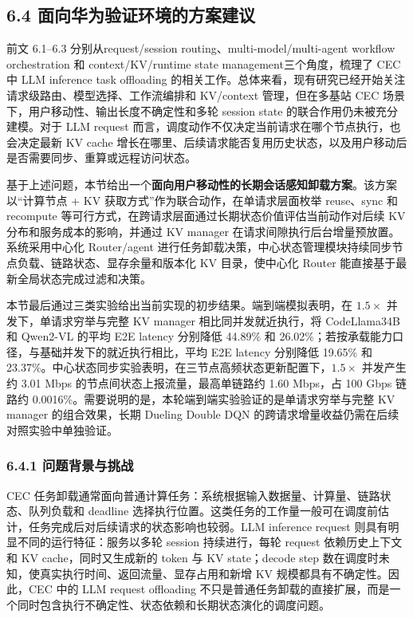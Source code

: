 \subsection*{6.4 面向华为验证环境的方案建议}

前文 6.1--6.3 分别从request/\allowbreak session routing、multi-model/\allowbreak multi-agent workflow orchestration 和 context/\allowbreak KV/\allowbreak runtime state management三个角度，梳理了 CEC 中 LLM inference task offloading 的相关工作。总体来看，现有研究已经开始关注请求级路由、模型选择、工作流编排和 KV/context 管理，但在多基站 CEC 场景下，用户移动性、输出长度不确定性和多轮 session state 的联合作用仍未被充分建模。对于 LLM request 而言，调度动作不仅决定当前请求在哪个节点执行，也会决定最新 KV cache 增长在哪里、后续请求能否复用历史状态，以及用户移动后是否需要同步、重算或远程访问状态。

基于上述问题，本节给出一个\textbf{面向用户移动性的长期会话感知卸载方案}。该方案以“计算节点 + KV 获取方式”作为联合动作，在单请求层面枚举 reuse、sync 和 recompute 等可行方式，在跨请求层面通过长期状态价值评估当前动作对后续 KV 分布和服务成本的影响，并通过 KV manager 在请求间隙执行后台增量预放置。系统采用中心化 Router/agent 进行任务卸载决策，中心状态管理模块持续同步节点负载、链路状态、显存余量和版本化 KV 目录，使中心化 Router 能直接基于最新全局状态完成过滤和决策。

本节最后通过三类实验给出当前实现的初步结果。端到端模拟表明，在 \(1.5\times\) 并发下，单请求穷举与完整 KV manager 相比同并发就近执行，将 CodeLlama34B 和 Qwen2-VL 的平均 E2E latency 分别降低 44.89\% 和 26.02\%；若按承载能力口径，与基础并发下的就近执行相比，平均 E2E latency 分别降低 19.65\% 和 23.37\%。中心状态同步实验表明，在三节点高频状态更新配置下，\(1.5\times\) 并发产生约 3.01 Mbps 的节点间状态上报流量，最高单链路约 1.60 Mbps，占 100 Gbps 链路约 0.0016\%。需要说明的是，本轮端到端实验验证的是单请求穷举与完整 KV manager 的组合效果，长期 Dueling Double DQN 的跨请求增量收益仍需在后续对照实验中单独验证。

\subsubsection*{6.4.1 问题背景与挑战}

CEC 任务卸载通常面向普通计算任务：系统根据输入数据量、计算量、链路状态、队列负载和 deadline 选择执行位置。这类任务的工作量一般可在调度前估计，任务完成后对后续请求的状态影响也较弱。LLM inference request 则具有明显不同的运行特征：服务以多轮 session 持续进行，每轮 request 依赖历史上下文和 KV cache，同时又生成新的 token 与 KV state；decode step 数在调度时未知，使真实执行时间、返回流量、显存占用和新增 KV 规模都具有不确定性。因此，CEC 中的 LLM request offloading 不只是普通任务卸载的直接扩展，而是一个同时包含执行不确定性、状态依赖和长期状态演化的调度问题。


